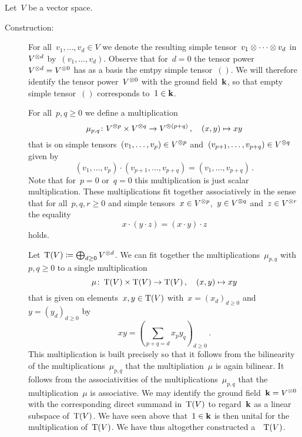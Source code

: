 \begin{recall}
  Let~$V$ be a vector space.
  \begin{description}
    \item[Construction:]
      For all~$v_1, \dotsc, v_d \in V$ we denote the resulting simple tensor~$v_1 \otimes \dotsb \otimes v_d$ in~$V^{\otimes d}$ by~$(v_1, \dotsc, v_d)$.
      Observe that for~$d = 0$ the tensor power~$V^{\otimes d} = V^{\otimes 0}$ has as a basis the emtpy simple tensor~$()$.
      We will therefore identify the tensor power~$V^{\otimes 0}$ with the ground field~$\kf$, so that empty simple tensor~$()$ corresponds to~$1 \in \mathbf{k}$.
      
      For all~$p, q \geq 0$ we define a multiplication
      \[
        \mu_{p,q}
        \colon
        V^{\otimes p} \times V^{\otimes q}
        \to
        V^{\otimes (p+q)} \,,
        \quad
        (x,y)
        \mapsto
        x y
      \]
      that is on simple tensors~$(v_1, \dotsc, v_p) \in V^{\otimes p}$ and~$(v_{p+1}, \dotsc, v_{p+q}) \in V^{\otimes q}$ given by
      \[
        (v_1, \dotsc, v_p) \cdot (v_{p+1}, \dotsc, v_{p+q})
        =
        (v_1, \dotsc, v_{p+q})  \,.
      \]
      Note that for~$p = 0$ or~$q = 0$ this multiplication is just scalar multiplication.  
      These multiplications fit together associatively in the sense that for all~$p, q, r \geq 0$ and simple tensors~$x \in V^{\otimes p}$,~$y \in V^{\otimes q}$ and~$z \in V^{\otimes r}$ the equality
      \[
        x \cdot (y \cdot z)
        =
        (x \cdot y) \cdot z
      \]
      holds.
      
      Let~$\operatorname{T}(V) \coloneqq \bigoplus_{d \geq 0} V^{\otimes d}$.
      We can fit together the multiplications~$\mu_{p,q}$ with~$p, q \geq 0$ to a single multiplication
      \[
        \mu
        \colon
        \operatorname{T}(V) \times \operatorname{T}(V)
        \to
        \operatorname{T}(V)  \,,
        \quad
        (x,y)
        \mapsto
        xy 
      \]
      that is given on elements~$x, y \in \operatorname{T}(V)$ with~$x = (x_d)_{d \geq 0}$ and~$y = (y_d)_{d \geq 0}$ by
      \[
        x y
        =
        \left(
          \sum_{p+q = d} x_p y_q
        \right)_{d \geq 0} \,.
      \]
      This multiplication is built precisely so that it follows from the bilinearity of the multiplications~$\mu_{p,q}$ that the multipliation~$\mu$ is again bilinear.
      It follows from the associativities of the multiplications~$\mu_{p,q}$ that the multiplication~$\mu$ is associative.
      We may identify the ground field~$\mathbf{k} = V^{\otimes 0}$ with the corresponding direct summand in~$\operatorname{T}(V)$ to regard~$\kf$ as a linear subspace of~$\operatorname{T}(V)$.
      We have seen above that~$1 \in \mathbf{k}$ is then unital for the multiplication of~$\operatorname{T}(V)$.
      We have thus altogether constructed a~{\algebra{$\kf$}}~$\operatorname{T}(V)$.
      

\end{description}
\end{recall}

